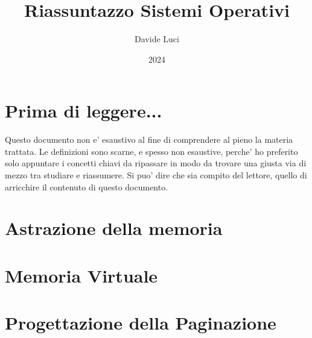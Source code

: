 \documentclass{article}
\title{Riassuntazzo Sistemi Operativi}
\author{Davide Luci}
\date{2024}
\begin{document}
    \maketitle
    \tableofcontents
    \newpage


    \setlength{\parindent}{0pt}
    \section{ Prima di leggere...}
    Questo documento non e' esaustivo al fine di comprendere al pieno la materia trattata.
    Le definizioni sono scarne, e spesso non esaustive, perche' ho preferito solo appuntare i concetti chiavi
    da ripassare in modo da trovare una giusta via di mezzo tra studiare e riassumere. Si puo' dire che sia compito del 
    lettore, quello di arricchire il contenuto di questo documento.

    \section {Astrazione della memoria}
        
    \section {Memoria Virtuale}
        
    \section {Progettazione della Paginazione}
        
    
\end{document}
